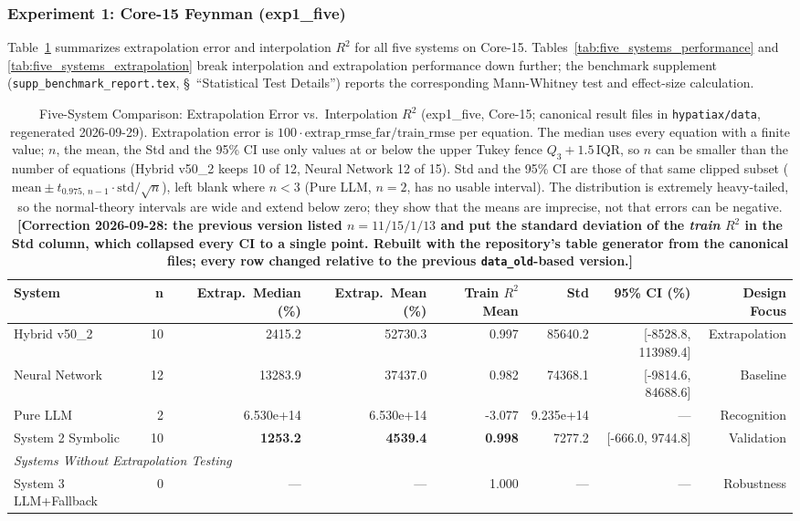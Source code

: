 \documentclass[twoside,11pt]{article}
\begin{document}
\subsubsection{Experiment 1: Core-15 Feynman (exp1\_five)}\label{subsubsec:five-system-exp1}

Table~\ref{tab:five_systems_full} summarizes extrapolation error
and interpolation $R^2$ for all five systems on Core-15. Tables~\ref{tab:five_systems_performance}
and \ref{tab:five_systems_extrapolation} break interpolation and extrapolation
performance down further; the benchmark supplement
(\texttt{supp\_benchmark\_report.tex}, \S~``Statistical Test Details'') reports
the corresponding Mann-Whitney test and effect-size calculation.

\begin{table}[t]
\centering
\caption{Five-System Comparison: Extrapolation Error vs.\ Interpolation $R^2$
  (exp1\_five, Core-15; canonical result files in \texttt{hypatiax/data}, regenerated 2026-09-29).
  Extrapolation error is $100\cdot\mathrm{extrap\_rmse\_far}/\mathrm{train\_rmse}$ per
  equation. The median uses every equation with a finite value; $n$, the mean, the Std and
  the 95\% CI use only values at or below the upper Tukey fence $Q_3+1.5\,\mathrm{IQR}$, so
  $n$ can be smaller than the number of equations (Hybrid v50\_2 keeps 10 of 12, Neural
  Network 12 of 15). Std and the 95\% CI are those of that same clipped subset
  ($\mathrm{mean} \pm t_{0.975,\,n-1} \cdot \mathrm{std}/\sqrt{n}$), left
  blank where $n<3$ (Pure LLM, $n=2$, has no usable interval). The distribution is extremely heavy-tailed, so the
  normal-theory intervals are wide and extend below zero; they show that the means
  are imprecise, not that errors can be negative.
  \textbf{[Correction 2026-09-28: the previous version listed $n=11/15/1/13$ and put
  the standard deviation of the \emph{train} $R^2$ in the Std column, which collapsed
  every CI to a single point. Rebuilt with the repository's table generator from the
  canonical files; every row changed relative to the previous \texttt{data\_old}-based version.]}}
\label{tab:five_systems_full}
\begin{tabular}{lrrrrrrr}
\toprule
\textbf{System} & \textbf{n}
  & \textbf{Extrap.\ Median (\%)} & \textbf{Extrap.\ Mean (\%)}
  & \textbf{Train $R^2$ Mean} & \textbf{Std} & \textbf{95\% CI (\%)}
  & \textbf{Design Focus} \\
\midrule
Hybrid v50\_2 & 10 & 2415.2 & 52730.3 & 0.997 & 85640.2 & [-8528.8, 113989.4] & Extrapolation \\
Neural Network & 12 & 13283.9 & 37437.0 & 0.982 & 74368.1 & [-9814.6, 84688.6] & Baseline \\
Pure LLM & 2 & 6.530e+14 & 6.530e+14 & -3.077 & 9.235e+14 & --- & Recognition \\
System 2 Symbolic & 10 & \textbf{1253.2} & \textbf{4539.4} & \textbf{0.998} & 7277.2 & [-666.0, 9744.8] & Validation \\
\midrule
\multicolumn{8}{l}{\textit{Systems Without Extrapolation Testing}} \\
System 3 LLM+Fallback & 0 & --- & --- & 1.000 & --- & --- & Robustness \\
\bottomrule
\end{tabular}
\end{table}
\end{document}
